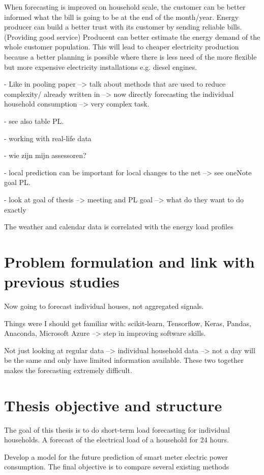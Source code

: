 When forecasting is improved on household scale, the customer can be better informed what the bill is going to be at the end of the month/year.
Energy producer can build a better trust with its customer by sending reliable bills. (Providing good service)
Producent can better estimate the energy demand of the whole customer population. This will lead to cheaper electricity production because a better planning is possible where there is less need of the more 
flexible but more expensive electricity installations e.g. diesel engines.

- Like in pooling paper --> talk about methods that are used to reduce complexity/ already written in --> now directly forecasting the individual household consumption --> very complex task. 


- see also table PL. 

- working with real-life data

- wie zijn mijn assessoren? 

- local prediction can be important for local changes to the net --> see oneNote goal PL.

- look at goal of thesis --> meeting and PL goal --> what do they want to do exactly

The weather and calendar data is correlated with the energy load profiles

\section{Problem formulation and link with previous studies}
Now going to forecast individual houses, not aggregated signals. 

Things were I should get familiar with: scikit-learn, Tensorflow, Keras, Pandas, Anaconda, Microsoft Azure --> step in improving software skills.

Not just looking at regular data --> individual household data --> not a day will be the same and only have limited information available. These two together makes the forecasting extremely difficult. 


\section{Thesis objective and structure}
The goal of this thesis is to do short-term load forecasting for individual households. A forecast of the electrical load of a household for 24 hours. 

Develop a model for the future prediction of smart meter electric power consumption. The final
objective is to compare several existing methods

